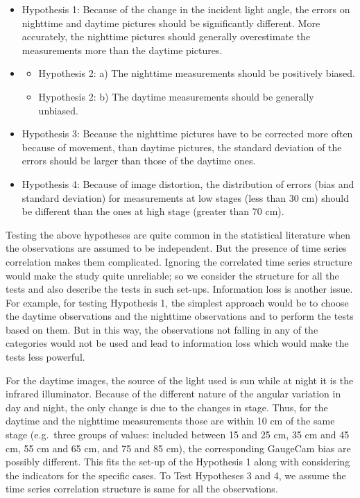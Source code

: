 \documentclass[]{article}
\begin{document}
\begin{itemize}
\item Hypothesis 1: Because of the change in the incident light angle, the errors on nighttime and daytime pictures should be significantly different. More accurately, the nighttime pictures should generally overestimate the measurements more than the daytime pictures.
\item \begin{itemize}
\item Hypothesis 2: a) The nighttime measurements should be positively biased.
\item Hypothesis 2: b) The daytime measurements should be generally unbiased.
\end{itemize}  
\item Hypothesis 3: Because the nighttime pictures have to be corrected more often because of movement, than daytime pictures, the standard deviation of the errors should be larger than those of the daytime ones.
\item Hypothesis 4: Because of image distortion, the distribution of errors (bias and standard deviation) for measurements at low stages (less  than 30 cm) should be different than the ones at high stage (greater than 70 cm).
\end{itemize}

Testing the above hypotheses are quite common in the statistical literature when the observations are assumed to be independent. But the presence of time series correlation makes them complicated. Ignoring the correlated time series structure would make the study quite unreliable; so we consider the structure for all the tests and also describe the tests in such set-ups. Information loss is another issue. For example, for testing Hypothesis 1, the simplest approach would be to choose the daytime observations and the nighttime observations and to perform the tests based on them. But in this way, the observations not falling in any of the categories would not be used and lead to information loss which would make the tests less powerful.

For the daytime images, the source of the light used is sun while at night it is the infrared illuminator. Because of the different nature of the angular variation in day and night, the only change is due to the changes in stage. Thus, for the daytime and the nighttime measurements those are within 10 cm of the same stage (e.g.~three groups of values: included between 15 and 25 cm, 35 cm and 45 cm, 55 cm and 65 cm, and 75 and 85 cm), the corresponding GaugeCam bias are possibly different. This fits the set-up of the Hypothesis 1 along with considering the indicators for the specific cases. To Test Hypotheses 3 and 4, we assume the time series correlation structure is same for all the observations.
\end{document}

